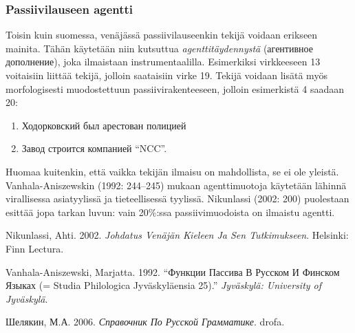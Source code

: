 \documentclass[]{scrartcl}
\providecommand{\tightlist}{%
  \setlength{\itemsep}{0pt}\setlength{\parskip}{0pt}}
\begin{document}
\subsubsection{Passiivilauseen agentti}\label{passiivilauseen-agentti}

Toisin kuin suomessa, venäjässä passiivilauseenkin tekijä voidaan
erikseen mainita. Tähän käytetään niin kutsuttua
\emph{agenttitäydennystä} (агентивное дополнение), joka ilmaistaan
instrumentaalilla. Esimerkiksi virkkeeseen 13 voitaisiin liittää tekijä,
jolloin saataisiin virke 19. Tekijä voidaan lisätä myös morfologisesti
muodostettuun passiivirakenteeseen, jolloin esimerkistä 4 saadaan 20:

\begin{enumerate}
\def\labelenumi{(\arabic{enumi})}
\setcounter{enumi}{18}
\tightlist
\item
  Ходорковский был арестован полицией
\item
  Завод строится компанией ``NCC''.
\end{enumerate}

Huomaa kuitenkin, että vaikka tekijän ilmaisu on mahdollista, se ei ole
yleistä. Vanhala-Aniszewskin (1992: 244--245) mukaan agenttimuotoja
käytetään lähinnä virallisessa asiatyylissä ja tieteellisessä tyylissä.
Nikunlassi (2002: 200) puolestaan esittää jopa tarkan luvun: vain
20\%:ssa passiivimuodoista on ilmaistu agentti.

Nikunlassi, Ahti. 2002. \emph{Johdatus Venäjän Kieleen Ja Sen
Tutkimukseen}. Helsinki: Finn Lectura.

Vanhala-Aniszewski, Marjatta. 1992. ``Функции Пассива В Русском И
Финском Языках (= Studia Philologica Jyväskyläensia 25).''
\emph{Jyväskylä: University of Jyväskylä}.

Шелякин, М.А. 2006. \emph{Справочник По Русской Грамматике}. drofa.
\end{document}
